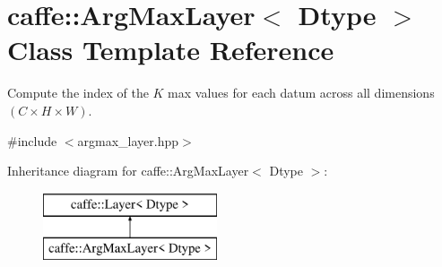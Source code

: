 \hypertarget{classcaffe_1_1ArgMaxLayer}{}\section{caffe\+:\+:Arg\+Max\+Layer$<$ Dtype $>$ Class Template Reference}
\label{classcaffe_1_1ArgMaxLayer}


Compute the index of the $ K $ max values for each datum across all dimensions $ (C \times H \times W) $.  




{\ttfamily \#include $<$argmax\+\_\+layer.\+hpp$>$}

Inheritance diagram for caffe\+:\+:Arg\+Max\+Layer$<$ Dtype $>$\+:\begin{figure}[H]
\begin{center}
\leavevmode
\includegraphics[height=2.000000cm]{classcaffe_1_1ArgMaxLayer}
\end{center}
\end{figure}
